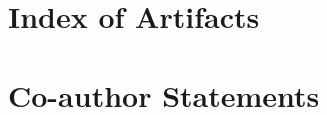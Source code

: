 \chapter{Index of Artifacts}\label{app:sec:artifacts}

\clearpage

\chapter{Co-author Statements}\label{app:sec:coauth}

\clearpage

\pagestyle{plain}
\printglossary[type=\acronymtype,nonumberlist,title={Index of Acronyms}]
\clearpage

\pagestyle{plain}
\printglossary[type=symbols]
\clearpage

\printindex